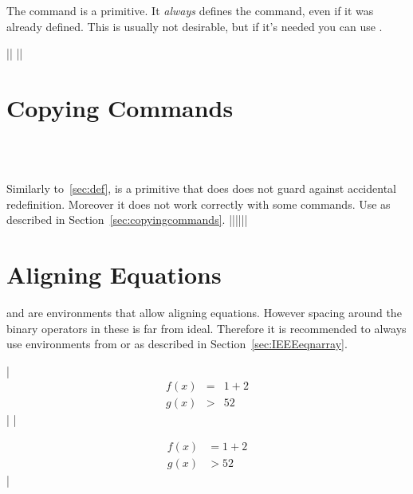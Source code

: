 The  command is a  primitive. It \emph{always} defines
the command, even if it was already defined. This is usually not desirable, but
if it's needed you can use .
\begin{chktexignore}
  \vchto|\def\foo#1#2#3{ ... }|
  ||
\end{chktexignore}

\section{Copying Commands}
 {
   \\
   \\
}

Similarly to~\ref{sec:def},  is a  primitive that does
does not guard against accidental redefinition. Moreover it does not work
correctly with some  commands. Use  as
described in Section~\ref{sec:copyingcommands}.
\chto|\let\foo\bar||\NewCommandCopy\foo\bar|

\section{Aligning Equations}

 and  are  environments that allow
aligning equations. However spacing around the binary operators in these is far
from ideal. Therefore it is recommended to always use  environments
from  or  as described in
Section~\ref{sec:IEEEeqnarray}.
\begin{chktexignore}
\chto
|\begin{eqnarray}
  f(x) & = &  1 + 2 \\
  g(x) & > & 52
\end{eqnarray}|
|\usepackage{amsmath}
\begin{align}
  f(x) & = 1 + 2 \\
  g(x) & > 52
\end{align}|
\end{chktexignore}

